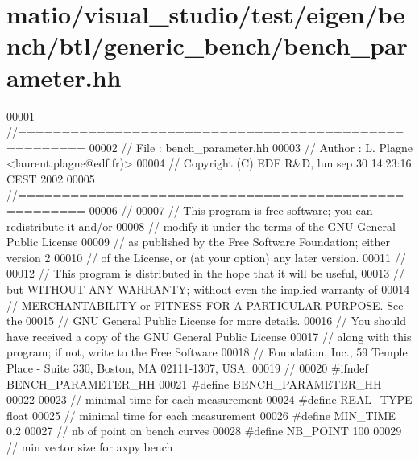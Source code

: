 \hypertarget{matio_2visual__studio_2test_2eigen_2bench_2btl_2generic__bench_2bench__parameter_8hh_source}{}\section{matio/visual\+\_\+studio/test/eigen/bench/btl/generic\+\_\+bench/bench\+\_\+parameter.hh}
\label{matio_2visual__studio_2test_2eigen_2bench_2btl_2generic__bench_2bench__parameter_8hh_source}

\begin{DoxyCode}
00001 \textcolor{comment}{//=====================================================}
00002 \textcolor{comment}{// File   :  bench\_parameter.hh}
00003 \textcolor{comment}{// Author :  L. Plagne <laurent.plagne@edf.fr)>}
00004 \textcolor{comment}{// Copyright (C) EDF R&D,  lun sep 30 14:23:16 CEST 2002}
00005 \textcolor{comment}{//=====================================================}
00006 \textcolor{comment}{//}
00007 \textcolor{comment}{// This program is free software; you can redistribute it and/or}
00008 \textcolor{comment}{// modify it under the terms of the GNU General Public License}
00009 \textcolor{comment}{// as published by the Free Software Foundation; either version 2}
00010 \textcolor{comment}{// of the License, or (at your option) any later version.}
00011 \textcolor{comment}{//}
00012 \textcolor{comment}{// This program is distributed in the hope that it will be useful,}
00013 \textcolor{comment}{// but WITHOUT ANY WARRANTY; without even the implied warranty of}
00014 \textcolor{comment}{// MERCHANTABILITY or FITNESS FOR A PARTICULAR PURPOSE.  See the}
00015 \textcolor{comment}{// GNU General Public License for more details.}
00016 \textcolor{comment}{// You should have received a copy of the GNU General Public License}
00017 \textcolor{comment}{// along with this program; if not, write to the Free Software}
00018 \textcolor{comment}{// Foundation, Inc., 59 Temple Place - Suite 330, Boston, MA  02111-1307, USA.}
00019 \textcolor{comment}{//}
00020 \textcolor{preprocessor}{#ifndef BENCH\_PARAMETER\_HH}
00021 \textcolor{preprocessor}{#define BENCH\_PARAMETER\_HH}
00022 
00023 \textcolor{comment}{// minimal time for each measurement}
00024 \textcolor{preprocessor}{#define REAL\_TYPE float}
00025 \textcolor{comment}{// minimal time for each measurement}
00026 \textcolor{preprocessor}{#define MIN\_TIME 0.2}
00027 \textcolor{comment}{// nb of point on bench curves}
00028 \textcolor{preprocessor}{#define NB\_POINT 100}
00029 \textcolor{comment}{// min vector size for axpy bench}

\end{DoxyCode}
